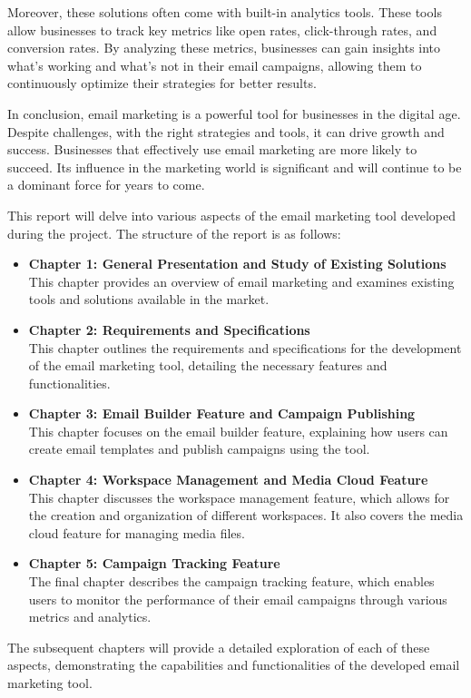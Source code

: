 \vspace{10pt}

Moreover, these solutions often come with built-in analytics tools. These tools allow businesses to track key metrics like open rates, click-through rates, and conversion rates. By analyzing these metrics, businesses can gain insights into what’s working and what’s not in their email campaigns, allowing them to continuously optimize their strategies for better results.

\vspace{10pt}

In conclusion, email marketing is a powerful tool for businesses in the digital age. Despite challenges, with the right strategies and tools, it can drive growth and success. Businesses that effectively use email marketing are more likely to succeed. Its influence in the marketing world is significant and will continue to be a dominant force for years to come.

\vspace{20pt}

This report will delve into various aspects of the email marketing tool developed during the project. The structure of the report is as follows:

\begin{itemize}
    \item \textbf{Chapter 1: General Presentation and Study of Existing Solutions} \\
    This chapter provides an overview of email marketing and examines existing tools and solutions available in the market.
    
    \item \textbf{Chapter 2: Requirements and Specifications} \\
    This chapter outlines the requirements and specifications for the development of the email marketing tool, detailing the necessary features and functionalities.
    
    \item \textbf{Chapter 3: Email Builder Feature and Campaign Publishing} \\
    This chapter focuses on the email builder feature, explaining how users can create email templates and publish campaigns using the tool.
    
    \item \textbf{Chapter 4: Workspace Management and Media Cloud Feature} \\
    This chapter discusses the workspace management feature, which allows for the creation and organization of different workspaces. It also covers the media cloud feature for managing media files.
    
    \item \textbf{Chapter 5: Campaign Tracking Feature} \\
    The final chapter describes the campaign tracking feature, which enables users to monitor the performance of their email campaigns through various metrics and analytics.
\end{itemize}

The subsequent chapters will provide a detailed exploration of each of these aspects, demonstrating the capabilities and functionalities of the developed email marketing tool.
